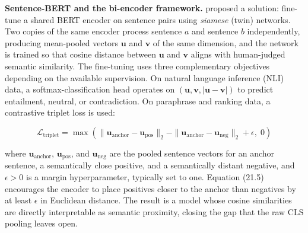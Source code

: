 \textbf{Sentence-BERT and the bi-encoder framework.} \cite{reimers2019sbert} proposed a solution: fine-tune a shared BERT encoder on sentence pairs using \textit{siamese} (twin) networks. Two copies of the same encoder process sentence $a$ and sentence $b$ independently, producing mean-pooled vectors $\mathbf{u}$ and $\mathbf{v}$ of the same dimension, and the network is trained so that cosine distance between $\mathbf{u}$ and $\mathbf{v}$ aligns with human-judged semantic similarity. The fine-tuning uses three complementary objectives depending on the available supervision. On natural language inference (NLI) data, a softmax-classification head operates on $(\mathbf{u}, \mathbf{v}, |\mathbf{u} - \mathbf{v}|)$ to predict entailment, neutral, or contradiction. On paraphrase and ranking data, a contrastive triplet loss is used:

\begin{equation}
\mathcal{L}_{\text{triplet}} = \max\!\left(\|\mathbf{u}_{\text{anchor}} - \mathbf{u}_{\text{pos}}\|_{2} - \|\mathbf{u}_{\text{anchor}} - \mathbf{u}_{\text{neg}}\|_{2} + \epsilon,\; 0\right)
\tag{21.5}
\end{equation}

where $\mathbf{u}_{\text{anchor}}$, $\mathbf{u}_{\text{pos}}$, and $\mathbf{u}_{\text{neg}}$ are the pooled sentence vectors for an anchor sentence, a semantically close positive, and a semantically distant negative, and $\epsilon > 0$ is a margin hyperparameter, typically set to one. Equation (21.5) encourages the encoder to place positives closer to the anchor than negatives by at least $\epsilon$ in Euclidean distance. The result is a model whose cosine similarities are directly interpretable as semantic proximity, closing the gap that the raw CLS pooling leaves open.

